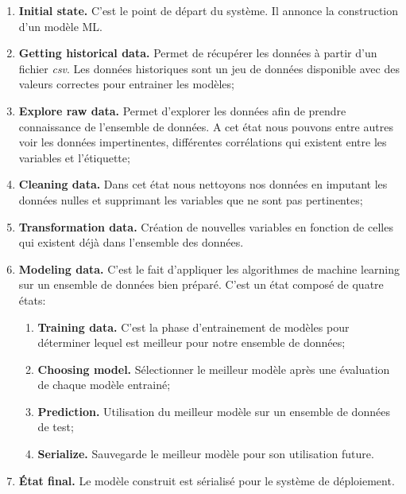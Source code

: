 \documentclass[12pt, french]{report}
\begin{document}
\begin{enumerate}
\item \textbf{Initial state.} C'est le point de départ du système. Il annonce la construction d'un modèle ML. 
\item \textbf{Getting historical data.} Permet de récupérer les données à partir d'un fichier \textit{csv}. Les données historiques sont un jeu de données disponible avec des valeurs correctes pour entrainer les modèles;
\item \textbf{Explore raw data.} Permet d'explorer les données afin de prendre connaissance de l'ensemble de données. A cet état nous pouvons entre autres voir les données impertinentes, différentes corrélations qui existent entre les variables et l'étiquette;
\item \textbf{Cleaning data.} Dans cet état nous nettoyons nos données en imputant les données nulles et supprimant les variables que ne sont pas pertinentes;
\item \textbf{Transformation data.} Création de nouvelles variables en fonction de celles qui existent déjà dans l'ensemble des données. 
\item \textbf{Modeling data.} C'est le fait d'appliquer les algorithmes de machine learning sur un ensemble de données bien préparé. C'est un état composé de quatre états: 
\begin{enumerate}
	\item \textbf{Training data.} C'est la phase d'entrainement de modèles pour déterminer lequel est meilleur pour notre ensemble de données;
	\item \textbf{Choosing model.} Sélectionner le meilleur modèle après une évaluation de chaque modèle entrainé;
	\item \textbf{Prediction.} Utilisation du meilleur modèle sur un ensemble de données de test;
	\item \textbf{Serialize.} Sauvegarde le meilleur modèle pour son utilisation future.
\end{enumerate} 
\item \textbf{État final.} Le modèle construit est sérialisé pour le système de déploiement. 
\end{enumerate}
\end{document}
